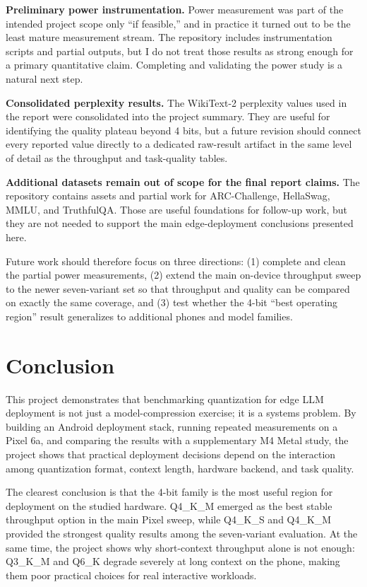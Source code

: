 \documentclass{article}
\begin{document}
\textbf{Preliminary power instrumentation.} Power measurement was part of the intended project scope only ``if feasible,'' and in practice it turned out to be the least mature measurement stream. The repository includes instrumentation scripts and partial outputs, but I do not treat those results as strong enough for a primary quantitative claim. Completing and validating the power study is a natural next step.

\textbf{Consolidated perplexity results.} The WikiText-2 perplexity values used in the report were consolidated into the project summary. They are useful for identifying the quality plateau beyond 4 bits, but a future revision should connect every reported value directly to a dedicated raw-result artifact in the same level of detail as the throughput and task-quality tables.

\textbf{Additional datasets remain out of scope for the final report claims.} The repository contains assets and partial work for ARC-Challenge, HellaSwag, MMLU, and TruthfulQA. Those are useful foundations for follow-up work, but they are not needed to support the main edge-deployment conclusions presented here.

Future work should therefore focus on three directions: (1) complete and clean the partial power measurements, (2) extend the main on-device throughput sweep to the newer seven-variant set so that throughput and quality can be compared on exactly the same coverage, and (3) test whether the 4-bit ``best operating region'' result generalizes to additional phones and model families.

\section{Conclusion}
\label{sec:conclusion}

This project demonstrates that benchmarking quantization for edge LLM deployment is not just a model-compression exercise; it is a systems problem. By building an Android deployment stack, running repeated measurements on a Pixel 6a, and comparing the results with a supplementary M4 Metal study, the project shows that practical deployment decisions depend on the interaction among quantization format, context length, hardware backend, and task quality.

The clearest conclusion is that the 4-bit family is the most useful region for deployment on the studied hardware. Q4\_K\_M emerged as the best stable throughput option in the main Pixel sweep, while Q4\_K\_S and Q4\_K\_M provided the strongest quality results among the seven-variant evaluation. At the same time, the project shows why short-context throughput alone is not enough: Q3\_K\_M and Q6\_K degrade severely at long context on the phone, making them poor practical choices for real interactive workloads.
\end{document}
